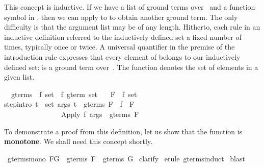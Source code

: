 \begin{isabellebody}
\begin{isamarkuptext}
This concept is inductive. If we have a list  of ground terms 
over~ and a function symbol  in , then we 
can apply  to  to obtain another ground term. 
The only difficulty is that the argument list may be of any length. Hitherto, 
each rule in an inductive definition referred to the inductively 
defined set a fixed number of times, typically once or twice. 
A universal quantifier in the premise of the introduction rule 
expresses that every element of  belongs
to our inductively defined set: is a ground term 
over~.  The function  denotes the set of elements in a given 
list.%
\end{isamarkuptext}%
\isamarkuptrue%
\isamarkupfalse%
\isanewline
\ \ gterms\ {\isacharcolon}{\isacharcolon}\ {\isachardoublequoteopen}{\isacharprime}f\ set\ {\isasymRightarrow}\ {\isacharprime}f\ gterm\ set{\isachardoublequoteclose}\isanewline
\ \ \ F\ {\isacharcolon}{\isacharcolon}\ {\isachardoublequoteopen}{\isacharprime}f\ set{\isachardoublequoteclose}\isanewline
{}\isanewline
step{\isacharbrackleft}intro{\isacharbang}{\isacharbrackright}{\isacharcolon}\ {\isachardoublequoteopen}{\isasymlbrakk}{\isasymforall}t\ {\isasymin}\ set\ args{\isachardot}\ t\ {\isasymin}\ gterms\ F{\isacharsemicolon}\ \ f\ {\isasymin}\ F{\isasymrbrakk}\isanewline
\ \ \ \ \ \ \ \ \ \ \ \ \ \ \ {\isasymLongrightarrow}\ {\isacharparenleft}Apply\ f\ args{\isacharparenright}\ {\isasymin}\ gterms\ F{\isachardoublequoteclose}%
\begin{isamarkuptext}%
To demonstrate a proof from this definition, let us 
show that the function 
is \textbf{monotone}.  We shall need this concept shortly.%
\end{isamarkuptext}%
\isamarkuptrue%
\isamarkupfalse%
\ gterms{\isacharunderscore}mono{\isacharcolon}\ {\isachardoublequoteopen}F{\isasymsubseteq}G\ {\isasymLongrightarrow}\ gterms\ F\ {\isasymsubseteq}\ gterms\ G{\isachardoublequoteclose}\isanewline
%
\isadelimproof
%
\endisadelimproof
%
\isatagproof
{}\isamarkupfalse%
\ clarify\isanewline
{}\isamarkupfalse%
\ {\isacharparenleft}erule\ gterms{\isachardot}induct{\isacharparenright}\isanewline
{}\isamarkupfalse%
\ blast\isanewline
{}\isamarkupfalse%
%
\endisatagproof
{\isafoldproof}%
%
\isadelimproof
%
\endisadelimproof
%
\isadelimproof
%
\endisadelimproof
%
\isatagproof
%
\begin{isamarkuptxt}%

\end{isamarkuptxt}
\end{isabellebody}

